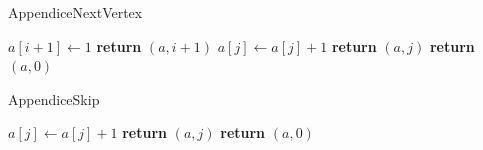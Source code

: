 	\begin{frame}{Appendice}{NextVertex}
		\begin{center}
			\begin{minipage}{5.8cm}
				\begin{algorithmic}[1]
						\State $a[i+1] \gets 1$
						\State \textbf{return} $(a, i+1)$
					\Else
								\State $a[j] \gets a[j] + 1$
								\State \textbf{return} $(a, j)$
							\EndIf
						\EndFor
					\EndIf
					\State \textbf{return} $(a, 0)$				
					\EndProcedure
				\end{algorithmic}
			\end{minipage}
		\end{center}	
	\end{frame}	

	\begin{frame}{Appendice}{Skip}
		\begin{center}
			\begin{minipage}{4.8cm}
				\begin{algorithmic}[1]
								\State $a[j] \gets a[j] + 1$
								\State \textbf{return} $(a,j)$
							\EndIf
						\EndFor										
						\State \textbf{return} $(a, 0)$				
					\EndProcedure
				\end{algorithmic}
			\end{minipage}
		\end{center}	
	\end{frame}	


